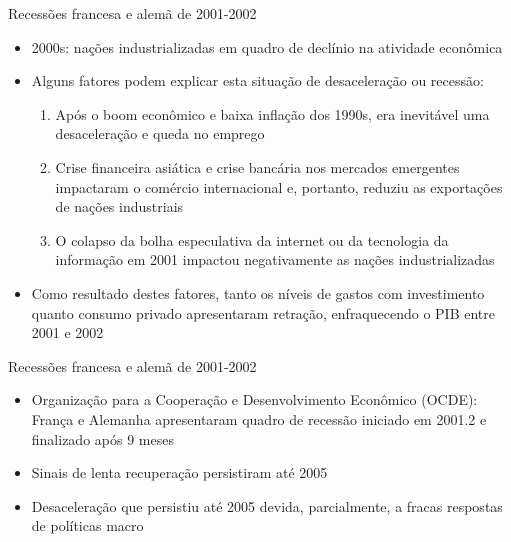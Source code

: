 \documentclass[10pt]{beamer}
\begin{document}
\begin{frame}{Recessões francesa e alemã de 2001-2002}
\begin{itemize}
    \item 2000s: nações industrializadas em quadro de declínio na atividade econômica
    \bigskip
    \item Alguns fatores podem explicar esta situação de desaceleração ou recessão:
    \medskip
    \begin{enumerate}
        \item Após o boom econômico e baixa inflação dos 1990s, era inevitável uma desaceleração e queda no emprego
        \bigskip
        \item Crise financeira asiática e crise bancária nos mercados emergentes impactaram o comércio internacional e, portanto, reduziu as exportações de nações industriais
        \bigskip
        \item O colapso da bolha especulativa da internet ou da tecnologia da informação em 2001 impactou negativamente as nações industrializadas
    \end{enumerate}
    \bigskip
    \item Como resultado destes fatores, tanto os níveis de gastos com investimento quanto consumo privado apresentaram retração, enfraquecendo o PIB entre 2001 e 2002
\end{itemize}
\end{frame}

\begin{frame}{Recessões francesa e alemã de 2001-2002}
\begin{itemize}
    \item Organização para a Cooperação e Desenvolvimento Econômico (OCDE): França e Alemanha apresentaram quadro de recessão iniciado em 2001.2 e finalizado após 9 meses
    \bigskip
    \item Sinais de lenta recuperação persistiram até 2005
    \bigskip
    \item Desaceleração que persistiu até 2005 devida, parcialmente, a fracas respostas de políticas macro
\end{itemize}
\end{frame}
\end{document}
